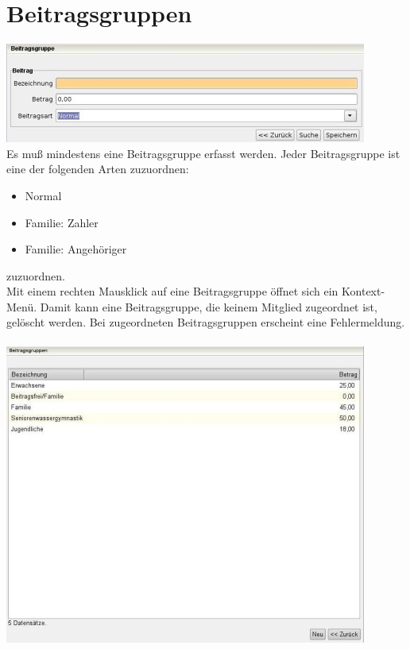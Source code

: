 \documentclass[a4paper,BCOR30mm,DIV14,pdftex,liststotoc,footsepline,openany]{scrbook}
\begin{document}
\section{Beitragsgruppen}
\label{beitragsgruppen}
\includegraphics{./screenshots/beitragsgruppe.jpg}\\
Es muß mindestens eine Beitragsgruppe erfasst werden. Jeder Beitragsgruppe ist eine der folgenden Arten zuzuordnen:
\begin{itemize}
 \item Normal
 \item Familie: Zahler
 \item Familie: Angehöriger
\end{itemize}
zuzuordnen.\\
Mit einem rechten Mausklick auf eine Beitragsgruppe öffnet sich ein Kontext-Menü. Damit kann eine Beitragsgruppe, die 
keinem Mitglied zugeordnet ist, gelöscht werden. Bei zugeordneten Beitragsgruppen erscheint eine Fehlermeldung.\\ \\
\includegraphics{./screenshots/beitragsgruppen.jpg}\\
\end{document}
